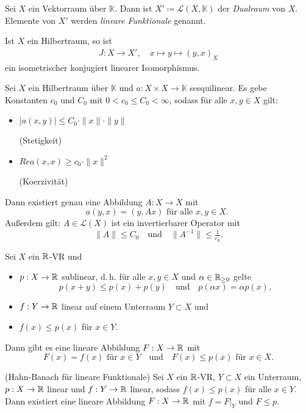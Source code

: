 \documentclass{cheat-sheet}
\newcommand{\K}{\mathbb{K}}
\begin{document}
\begin{defn}
  Sei $X$ ein Vektorraum über $\K$. Dann ist $X' \coloneqq \mathcal{L}(X, \K)$ der \emph{Dualraum} von $X$. Elemente von $X'$ werden \emph{lineare Funktionale} genannt.
\end{defn}

\begin{satz}
  Ist $X$ ein Hilbertraum, so ist
  \begin{align*}
    J : X \to X', \quad x \mapsto y \mapsto (y, x)_X
  \end{align*}
  ein isometrischer konjugiert linearer Isomorphismus.
\end{satz}

\begin{satz}
  Sei $X$ ein Hilbertraum über $\K$ und $a : X \times X \to \K$ sesquilinear. Es gebe Konstanten $c_0$ und $C_0$ mit $0 < c_0 \leq C_0 < \infty$, sodass für alle $x, y \in X$ gilt:
  \begin{itemize}
    \item $\left| a(x, y) \right| \leq C_0 \cdot \|x\| \cdot \|y\|$ {\raggedright (Stetigkeit)}
    \item $Re a(x, x) \geq c_0 \cdot \|x\|^2$ {\raggedright (Koerzivität)}
  \end{itemize}
  Dann existiert genau eine Abbildung $A : X \to X$ mit
  \[ a(y, x) = (y, Ax) \text{ für alle $x, y \in X$. } \]
  Außerdem gilt: $A \in \mathcal{L}(X)$ ist ein invertierbarer Operator mit
  \[ \|A\| \leq C_0 \quad \text{und} \quad \|A^{-1}\| \leq \tfrac{1}{c_0}. \]
\end{satz}

\begin{satz}
  Sei $X$ ein $\mathbb{R}$-VR und
  \begin{itemize}
    \item $p : X \to \mathbb{R}$ sublinear, d.\,h. für alle $x, y \in X$ und $\alpha \in \mathbb{R}_{\geq 0}$ gelte
    \[ p(x+y) \leq p(x) + p(y) \quad \text{und} \quad p(\alpha x) = \alpha p(x), \]
    \item $f : Y \to \mathbb{R}$ linear auf einem Unterraum $Y \subset X$ und
    \item $f(x) \leq p(x)$ für $x \in Y$.
  \end{itemize}
  Dann gibt es eine lineare Abbildung $F : X \to \mathbb{R}$ mit
  \[ F(x) = f(x) \text{ für $x \in Y$} \quad \text{und} \quad F(x) \leq p(x) \text{ für } x \in X. \]
\end{satz}

\begin{satz}(Hahn-Banach für lineare Funktionale)
  Sei $X$ ein $\mathbb{R}$-VR, $Y \subset X$ ein Unterraum, $p : X \to \mathbb{R}$ linear und $f : Y \to \mathbb{R}$ linear, sodass $f(x) \leq p(x)$ für alle $x \in Y$. Dann existiert eine lineare Abbildung $F : X \to \mathbb{R}$ mit $f = F|_Y \text{ und } F \leq p$.
\end{satz}
\end{document}
